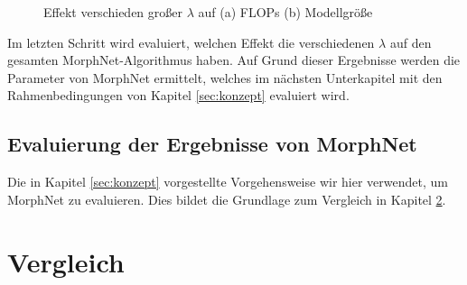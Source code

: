 \begin{figure}
     \centering
     \hfill
     \caption{Effekt verschieden großer $\lambda$ auf  (a) FLOPs (b) Modellgröße }
     \label{abb:morph2}
\end{figure}
Im letzten Schritt wird evaluiert, welchen Effekt die verschiedenen $\lambda$ auf den gesamten MorphNet-Algorithmus haben. Auf Grund dieser Ergebnisse werden die Parameter von MorphNet ermittelt, welches im nächsten Unterkapitel mit den Rahmenbedingungen von Kapitel \ref{sec:konzept} evaluiert wird.



\section{Evaluierung der Ergebnisse von MorphNet}

Die in Kapitel \ref{sec:konzept}  vorgestellte Vorgehensweise wir hier verwendet, um MorphNet zu evaluieren. Dies bildet die Grundlage zum Vergleich in Kapitel \ref{sec:vergleich}.














\chapter{Vergleich}\label{sec:vergleich}

